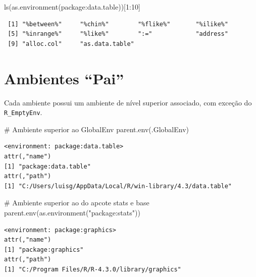 \documentclass[
  letterpaper,
  DIV=11,
  numbers=noendperiod]{scrreprt}
\newenvironment{Shaded}{\begin{snugshade}}{\end{snugshade}}
\newcommand{\CommentTok}[1]{\textcolor[rgb]{0.37,0.37,0.37}{#1}}
\newcommand{\DecValTok}[1]{\textcolor[rgb]{0.68,0.00,0.00}{#1}}
\newcommand{\FunctionTok}[1]{\textcolor[rgb]{0.28,0.35,0.67}{#1}}
\newcommand{\NormalTok}[1]{\textcolor[rgb]{0.00,0.23,0.31}{#1}}
\newcommand{\SpecialCharTok}[1]{\textcolor[rgb]{0.37,0.37,0.37}{#1}}
\newcommand{\StringTok}[1]{\textcolor[rgb]{0.13,0.47,0.30}{#1}}
\begin{document}
\begin{Shaded}
\begin{Highlighting}[]
\FunctionTok{ls}\NormalTok{(}\FunctionTok{as.environment}\NormalTok{(}\StringTok{\textquotesingle{}package:data.table\textquotesingle{}}\NormalTok{))[}\DecValTok{1}\SpecialCharTok{:}\DecValTok{10}\NormalTok{]}
\end{Highlighting}
\end{Shaded}

\begin{verbatim}
 [1] "%between%"     "%chin%"        "%flike%"       "%ilike%"      
 [5] "%inrange%"     "%like%"        ":="            "address"      
 [9] "alloc.col"     "as.data.table"
\end{verbatim}

\hypertarget{ambientes-pai}{%
\section{Ambientes ``Pai''}\label{ambientes-pai}}

Cada ambiente possui um ambiente de nível superior associado, com
exceção do \texttt{R\_EmptyEnv}.

\begin{Shaded}
\begin{Highlighting}[]
\CommentTok{\# Ambiente superior ao GlobalEnv}
\FunctionTok{parent.env}\NormalTok{(.GlobalEnv)}
\end{Highlighting}
\end{Shaded}

\begin{verbatim}
<environment: package:data.table>
attr(,"name")
[1] "package:data.table"
attr(,"path")
[1] "C:/Users/luisg/AppData/Local/R/win-library/4.3/data.table"
\end{verbatim}

\begin{Shaded}
\begin{Highlighting}[]
\CommentTok{\# Ambiente superior ao do apcote stats e base}
\FunctionTok{parent.env}\NormalTok{(}\FunctionTok{as.environment}\NormalTok{(}\StringTok{"package:stats"}\NormalTok{))}
\end{Highlighting}
\end{Shaded}

\begin{verbatim}
<environment: package:graphics>
attr(,"name")
[1] "package:graphics"
attr(,"path")
[1] "C:/Program Files/R/R-4.3.0/library/graphics"
\end{verbatim}
\end{document}
